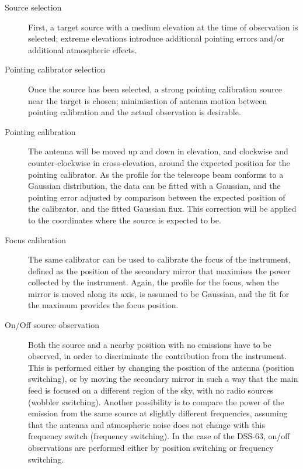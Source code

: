 \begin{description}
	\item[Source selection] First, a target source with a medium
       elevation at the time of observation is selected; extreme
       elevations introduce additional pointing errors and/or
       additional atmospheric effects.
	
	\item[Pointing calibrator selection] Once the source has
       been selected, a strong pointing calibration source near the
       target is chosen; minimisation of antenna motion between
       pointing calibration and the actual observation is desirable.
	
	\item[Pointing calibration] The antenna will be moved up and
       down in elevation, and clockwise and counter-clockwise in
       cross-elevation, around the expected position for the
       pointing calibrator. As the profile for the telescope beam
       conforms to a Gaussian distribution, the data can be fitted
       with a Gaussian, and the pointing error adjusted by
       comparison between the expected position of the calibrator,
       and the fitted Gaussian flux. This correction will be
       applied to the coordinates where the source is expected to
       be.
	
	\item[Focus calibration] The same calibrator can be used to
       calibrate the focus of the instrument, defined as the
       position of the secondary mirror that maximises the power
       collected by the instrument. Again, the profile for the
       focus, when the mirror is moved along its axis, is assumed to
       be Gaussian, and the fit for the maximum provides the focus
       position.
	
	\item[On/Off source observation] Both the source and a
       nearby position with no emissions have to be observed, in
       order to discriminate the contribution from the instrument.
       This is performed either by changing the position of the
       antenna (position switching), or by moving the secondary
       mirror in such a way that the main feed is focused on a
       different region of the sky, with no radio sources (wobbler
       switching). Another possibility is to compare the power of
       the emission from the same source at slightly different
       frequencies, assuming that the antenna and atmospheric noise
       does not change with this frequency switch (frequency
       switching). In the case of the DSS-63, on/off observations
       are performed either by position switching or frequency
       switching.
	

\end{description}
